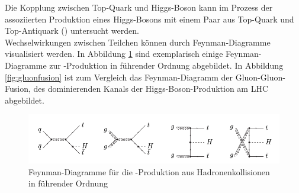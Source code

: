 Die Kopplung zwischen Top-Quark und Higgs-Boson kann im Prozess der assoziierten Produktion eines Higgs-Bosons mit einem Paar aus Top-Quark und Top-Antiquark (\ttH) untersucht werden.\\
Wechselwirkungen zwischen Teilchen k\"onnen durch Feynman-Diagramme visualisiert werden. In Abbildung \ref{fig:ttH_feynmans} sind exemplarisch einige Feynman-Diagramme zur \ttH-Produktion in f\"uhrender Ordnung abgebildet.%
In Abbildung \ref{fig:gluonfusion} ist zum Vergleich das Feynman-Diagramm der Gluon-Gluon-Fusion, des dominierenden Kanals der Higgs-Boson-Produktion am LHC abgebildet.


 \begin{figure}[tbp]
  \begin{center}
    \includegraphics[width=\textwidth]{graphics/ttH_feynmans.png}
    \parbox[b]{12cm}{
      \caption[\ttH Feynman-Diagramme]
             {\label{fig:ttH_feynmans}\!Feynman-Diagramme f\"ur die \ttH-Produktion aus Hadronenkollisionen in f\"uhrender Ordnung \cite{hep-ph/0211352}}
   }
 \end{center}
\end{figure}


